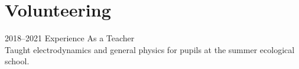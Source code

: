 \documentclass[]{cv-style}          %
\begin{document}
\begin{entrylist}
%
%
%
%

\end{entrylist}


\section{Volunteering}

\begin{entrylist}

\entrySkoltech
    {2018--2021}
    {Experience As a Teacher}
    {\jobtitle{}\\
Taught electrodynamics and general physics for pupils at the summer ecological school.}

\end{entrylist}



\end{document}
